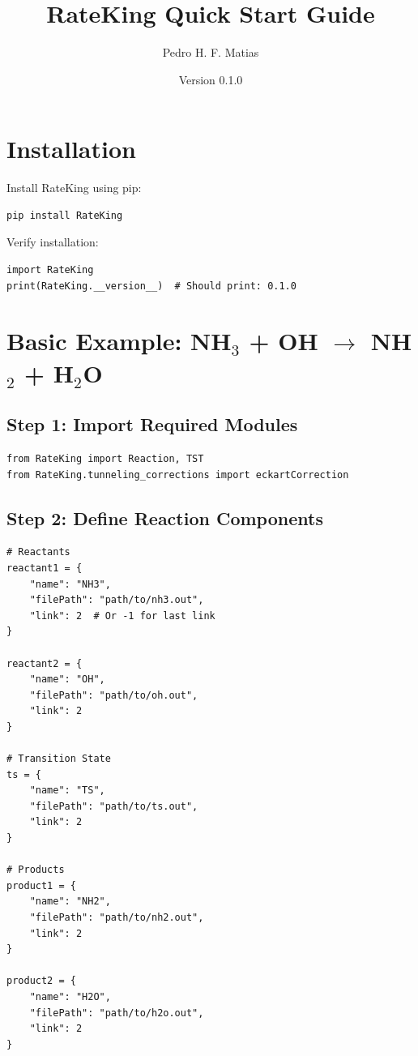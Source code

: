 \documentclass[11pt,a4paper]{article}
\title{\textbf{RateKing Quick Start Guide}}
\author{Pedro H. F. Matias}
\date{Version 0.1.0}
\begin{document}
\maketitle

\section{Installation}

Install RateKing using pip:

\begin{lstlisting}[language=bash, frame=single]
pip install RateKing
\end{lstlisting}

Verify installation:

\begin{lstlisting}
import RateKing
print(RateKing.__version__)  # Should print: 0.1.0
\end{lstlisting}

\section{Basic Example: NH$_3$ + OH $\to$ NH$_2$ + H$_2$O}

\subsection{Step 1: Import Required Modules}

\begin{lstlisting}
from RateKing import Reaction, TST
from RateKing.tunneling_corrections import eckartCorrection
\end{lstlisting}

\subsection{Step 2: Define Reaction Components}

\begin{lstlisting}
# Reactants
reactant1 = {
    "name": "NH3",
    "filePath": "path/to/nh3.out",
    "link": 2  # Or -1 for last link
}

reactant2 = {
    "name": "OH",
    "filePath": "path/to/oh.out",
    "link": 2
}

# Transition State
ts = {
    "name": "TS",
    "filePath": "path/to/ts.out",
    "link": 2
}

# Products
product1 = {
    "name": "NH2",
    "filePath": "path/to/nh2.out",
    "link": 2
}

product2 = {
    "name": "H2O",
    "filePath": "path/to/h2o.out",
    "link": 2
}
\end{lstlisting}
\end{document}
